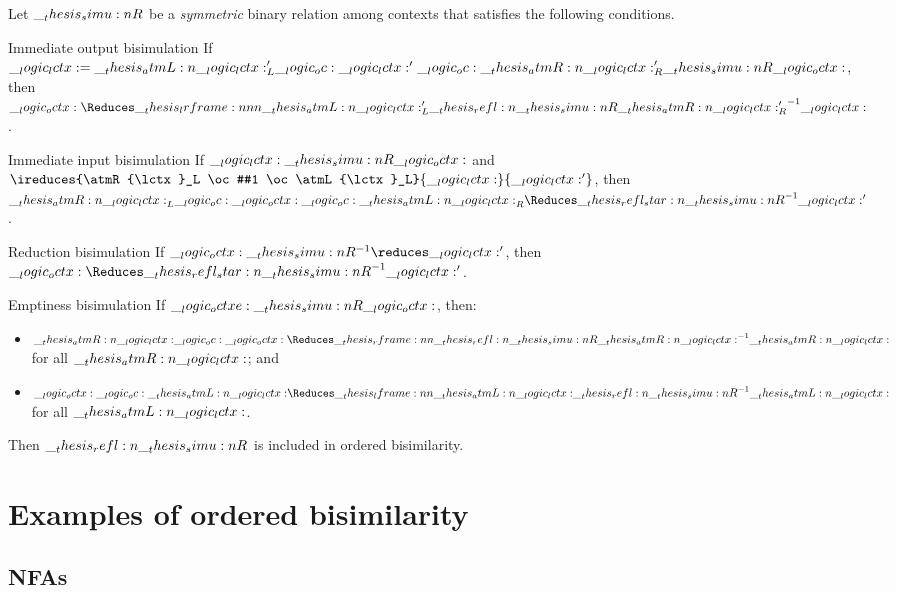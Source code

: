 \begin{theorem}\label{thm:ord-bisim-technique}
  Let $\__thesis_simu:n {R}$ be a \emph{symmetric} binary relation among contexts that satisfies the following conditions.
  \begin{thmdescription}
  \item[Immediate output bisimulation]
    If $\__logic_lctx: = \__thesis_atmL:n {\__logic_lctx:}'_L \__logic_oc: \__logic_lctx:' \__logic_oc: \__thesis_atmR:n {\__logic_lctx:}'_R \__thesis_simu:n {R} \__logic_octx:$, then $\octx \Reduces\lrframe{\atmL{\lctx}'_L}{\refl{\simu{R}}}{\atmR{\lctx}'_R}^{-1} \lctx$.
  \item[Immediate input bisimulation]
    If $\__logic_lctx: \__thesis_simu:n {R} \__logic_octx:$ and $\ireduces{\atmR{\lctx}_L \oc #1 \oc \atmL{\lctx}_L}{\lctx}{\lctx'}$, then $\atmR{\lctx}_L \oc \octx \oc \atmL{\lctx}_R \Reduces\refl*{\simu{R}}^{-1} \lctx'$.
  \item[Reduction bisimulation]
    If $\octx \simu{R}^{-1}\reduces \lctx'$, then $\octx \Reduces\refl*{\simu{R}}^{-1} \lctx'$.
  \item[Emptiness bisimulation]
    If $\__logic_octxe: \__thesis_simu:n {R} \__logic_octx:$, then:
    \begin{itemize}
    \item $\atmR{\lctx} \oc \octx \Reduces\rframe{\refl{\simu{R}}}{\atmR{\lctx}}^{-1} \atmR{\lctx}$ for all $\__thesis_atmR:n {\__logic_lctx:}$; and
    \item $\octx \oc \atmL{\lctx} \Reduces\lframe{\atmL{\lctx}}{\refl{\simu{R}}}^{-1} \atmL{\lctx}$ for all $\__thesis_atmL:n {\__logic_lctx:}$.
    \end{itemize}
  \end{thmdescription}
  Then $\refl{\simu{R}}$ is included in ordered bisimilarity.
\end{theorem}


\section{Examples of ordered bisimilarity}

\subsection{\Aclp*{NFA}}

